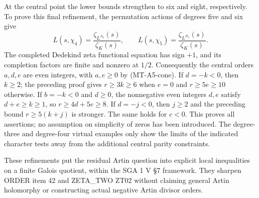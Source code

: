 At the central point the lower bounds strengthen to six and eight,
respectively. To prove this final refinement, the permutation actions
of degrees five and six give
\[
 L(s,\chi_4)=\frac{\zeta_{L^{A_4}}(s)}{\zeta_K(s)},\qquad
 L(s,\chi_5)=\frac{\zeta_{L^{D_5}}(s)}{\zeta_K(s)}.
\]
The completed Dedekind zeta functional equation has sign $+1$, and
its completion factors are finite and nonzero at $1/2$. Consequently
the central orders $a,d,e$ are even integers, with $a,e\ge0$ by
(MT-A5-cone). If $d=-k<0$, then $k\ge2$; the preceding proof gives
$r\ge3k\ge6$ when $e=0$ and $r\ge5e\ge10$ otherwise.
If $b=-k<0$ and $d\ge0$, the nonnegative even integers $d,e$
satisfy $d+e\ge k\ge1$, so $r\ge4d+5e\ge8$.
If $d=-j<0$, then $j\ge2$ and the preceding bound
$r\ge5(k+j)$ is stronger. The same holds for $c<0$.
This proves all assertions; no assumption on simplicity of zeros has
been introduced. The degree-three and degree-four virtual examples
only show the limits of the indicated character tests away from the
additional central parity constraints.

These refinements put the residual Artin question into explicit local
inequalities on a finite Galois quotient, within the SGA 1 V \S7
framework. They sharpen ORDER item 42 and ZETA\_TWO ZT02 without
claiming general Artin holomorphy or constructing actual negative
Artin divisor orders.
